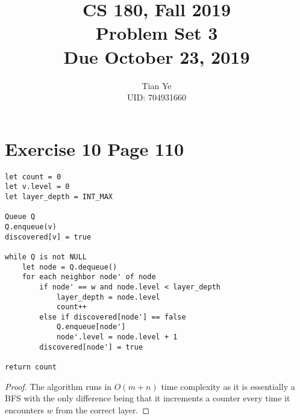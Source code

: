 \documentclass[11pt]{article}
\newcommand{\cnum}{CS 180}
\newcommand{\ced}{Fall 2019}
\newcommand{\ctitle}[3]{\title{\vspace{-0.5in}\cnum, \ced\\Problem Set #1 #2\\Due #3}}
\begin{document}
\ctitle{3}{}{October 23, 2019}
\author{Tian Ye \\ \small{UID: 704931660}}
\maketitle
\newpage

\section*{Exercise 10 Page 110}
\begin{lstlisting}
let count = 0
let v.level = 0
let layer_depth = INT_MAX

Queue Q
Q.enqueue(v)
discovered[v] = true

while Q is not NULL
	let node = Q.dequeue()
	for each neighbor node' of node
		if node' == w and node.level < layer_depth
			layer_depth = node.level
			count++
		else if discovered[node'] == false
			Q.enqueue[node']
			node'.level = node.level + 1
		discovered[node'] = true

return count
\end{lstlisting}
\begin{proof}
The algorithm runs in $O(m+n)$ time complexity as it is essentially a BFS with the only difference being that it increments a counter every time it encounters $w$ from the correct layer.
\end{proof}
\newpage
\end{document}

